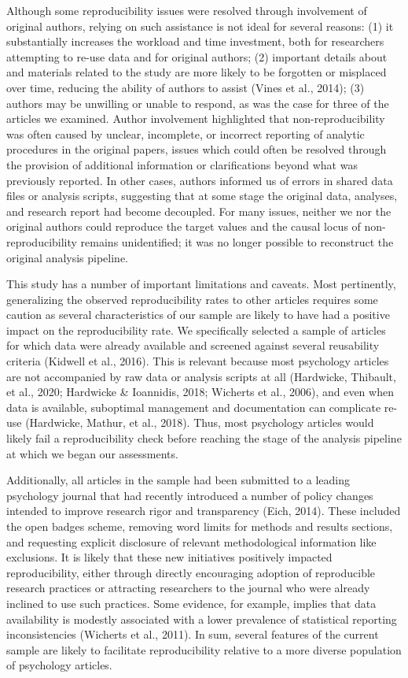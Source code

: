 \documentclass[english,,man,floatsintext]{apa6}
\begin{document}
Although some reproducibility issues were resolved through involvement of original authors, relying on such assistance is not ideal for several reasons: (1) it substantially increases the workload and time investment, both for researchers attempting to re-use data and for original authors; (2) important details about and materials related to the study are more likely to be forgotten or misplaced over time, reducing the ability of authors to assist (Vines et al., 2014); (3) authors may be unwilling or unable to respond, as was the case for three of the articles we examined. Author involvement highlighted that non-reproducibility was often caused by unclear, incomplete, or incorrect reporting of analytic procedures in the original papers, issues which could often be resolved through the provision of additional information or clarifications beyond what was previously reported. In other cases, authors informed us of errors in shared data files or analysis scripts, suggesting that at some stage the original data, analyses, and research report had become decoupled. For many issues, neither we nor the original authors could reproduce the target values and the causal locus of non-reproducibility remains unidentified; it was no longer possible to reconstruct the original analysis pipeline.

This study has a number of important limitations and caveats. Most pertinently, generalizing the observed reproducibility rates to other articles requires some caution as several characteristics of our sample are likely to have had a positive impact on the reproducibility rate. We specifically selected a sample of articles for which data were already available and screened against several reusability criteria (Kidwell et al., 2016). This is relevant because most psychology articles are not accompanied by raw data or analysis scripts at all (Hardwicke, Thibault, et al., 2020; Hardwicke \& Ioannidis, 2018; Wicherts et al., 2006), and even when data is available, suboptimal management and documentation can complicate re-use (Hardwicke, Mathur, et al., 2018). Thus, most psychology articles would likely fail a reproducibility check before reaching the stage of the analysis pipeline at which we began our assessments.

Additionally, all articles in the sample had been submitted to a leading psychology journal that had recently introduced a number of policy changes intended to improve research rigor and transparency (Eich, 2014). These included the open badges scheme, removing word limits for methods and results sections, and requesting explicit disclosure of relevant methodological information like exclusions. It is likely that these new initiatives positively impacted reproducibility, either through directly encouraging adoption of reproducible research practices or attracting researchers to the journal who were already inclined to use such practices. Some evidence, for example, implies that data availability is modestly associated with a lower prevalence of statistical reporting inconsistencies (Wicherts et al., 2011). In sum, several features of the current sample are likely to facilitate reproducibility relative to a more diverse population of psychology articles.
\end{document}
